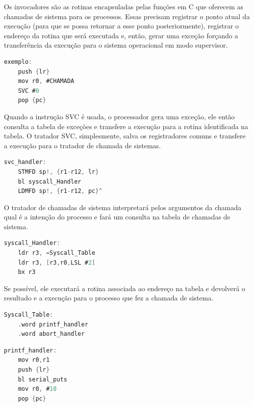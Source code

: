 Os invocadores são as rotinas encapsuladas pelas funções em C que oferecem as chamadas de sistema para os processos. Essas precisam registrar o ponto atual da execução (para que se possa retornar a esse ponto posteriormente), registrar o endereço da rotina que será executada e, então, gerar uma exceção forçando a transferência da execução para o sistema operacional em modo supervisor.

\begin{lstlisting}[language=C, caption={Exemplo de invocador}]
exemplo:
    push {lr}
    mov r0, #CHAMADA
    SVC #0 
    pop {pc}
\end{lstlisting}

Quando a instrução SVC é usada, o processador gera uma exceção, ele então consulta a tabela de exceções e transfere a execução para a rotina identificada na tabela.
O tratador SVC, simplesmente, salva os registradores comuns e transfere a execução para o tratador de chamada de sistemas.

\begin{lstlisting}[language=C, caption={Tratador SVC}]
svc_handler:
    STMFD sp!, {r1-r12, lr}
    bl syscall_Handler
    LDMFD sp!, {r1-r12, pc}^
\end{lstlisting}

O tratador de chamadas de sistema interpretará pelos argumentos da chamada qual é a intenção do processo e fará um consulta na tabela de chamadas de sistema.

\begin{lstlisting}[language=C, caption={Tratador de chamada de sistema}]
syscall_Handler:
    ldr r3, =Syscall_Table
    ldr r3, [r3,r0,LSL #2]
    bx r3
\end{lstlisting}

Se possível, ele executará a rotina associada ao endereço na tabela e devolverá o resultado e a execução para o processo que fez a chamada de sistema.

\begin{lstlisting}[language=C, caption={Tabela dos endereços das chamadas de sistema}]
Syscall_Table:
    .word printf_handler
    .word abort_handler
\end{lstlisting}

\begin{lstlisting}[language=C, caption={Exemplo de rotina que será de fato executada}]
printf_handler:
    mov r0,r1
    push {lr}
    bl serial_puts
    mov r0, #10
    pop {pc}
\end{lstlisting}


